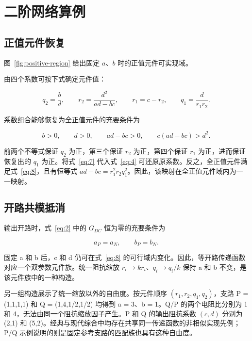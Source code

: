\section{二阶网络算例}

\subsection{正值元件恢复}
图~\ref{fig:positive-region} 给出固定 $a$、$b$ 时的正值元件可实现域。

由四个系数可按下式确定元件值：

\begin{equation}\label{eq:7}
q_2=\frac{b}{d},\qquad
r_2=\frac{d^2}{ad-bc},\qquad
r_1=c-r_2,\qquad
q_1=\frac{d}{r_1r_2}.
\end{equation}

系数组合能够恢复为全正值元件的充要条件为

\begin{equation}\label{eq:8}
b>0,\qquad d>0,\qquad ad-bc>0,\qquad
c(ad-bc)>d^2.
\end{equation}

前两个不等式保证 \(q_2\) 为正，第三个保证 \(r_2\) 为正，第四个保证 \(r_1\) 为正，进而保证恢复出的 \(q_1\) 为正。将式~\eqref{eq:7} 代入式~\eqref{eq:4} 可还原原系数。反之，全正值元件满足式~\eqref{eq:8}，且有恒等式 \(ad-bc=r_1^2r_2q_1^2\)。因此，该映射在全正值元件域内为一一映射。



\subsection{开路共模抵消}

输出开路时，式~\eqref{eq:2} 中的 \(G_{DC}\) 恒为零的充要条件为

\begin{equation}\label{eq:9}
a_P=a_N,\qquad b_P=b_N.
\end{equation}

固定 a 和 b 后，c 和 d 仍可在式~\eqref{eq:8} 的可行域内变化。因此，等开路传递函数对应一个双参数元件族。统一阻抗缩放 \(r_i\rightarrow kr_i\)、\(q_i\rightarrow q_i/k\) 保持 a 和 b 不变，是该元件族中的一种构造。

另一组构造展示了统一缩放以外的自由度。按元件顺序 \((r_1,r_2,q_1,q_2)\)，支路 P = (1,1,1,1) 和 Q = (1,4,1/2,1/2) 均得到 a = 3、b = 1。Q/P 的两个电阻比分别为 1 和 4，无法由同一个阻抗缩放因子产生。P 和 Q 的输出阻抗系数 \((c,d)\) 分别为 (2,1) 和 (5,2)。经典与现代综合中均存在共享同一传递函数的非相似实现先例\citep{fialkow1951rcladder,wang2017rcladder}；P/Q 示例说明的则是固定参考支路的匹配族也具有这种自由度。

